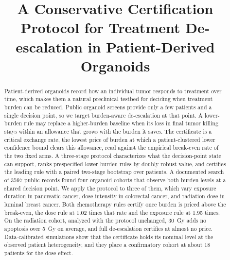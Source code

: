\documentclass[conference]{IEEEtran}
\begin{document}
\title{A Conservative Certification Protocol for Treatment De-escalation in Patient-Derived Organoids}

\author{
\and
{}
\and
{}
}

\maketitle

\begin{abstract}
Patient-derived organoids record how an individual tumor responds to treatment over time, which makes them a natural preclinical testbed for deciding when treatment burden can be reduced. Public organoid screens provide only a few patients and a single decision point, so we target burden-aware de-escalation at that point. A lower-burden rule may replace a higher-burden baseline when its loss in final tumor killing stays within an allowance that grows with the burden it saves. The certificate is a critical exchange rate, the lowest price of burden at which a patient-clustered lower confidence bound clears this allowance, read against the empirical break-even rate of the two fixed arms. A three-stage protocol characterizes what the decision-point state can support, ranks prespecified lower-burden rules by doubly robust value, and certifies the leading rule with a paired two-stage bootstrap over patients. A documented search of 3597 public records found four organoid cohorts that observe both burden levels at a shared decision point. We apply the protocol to three of them, which vary exposure duration in pancreatic cancer, dose intensity in colorectal cancer, and radiation dose in luminal breast cancer. Both chemotherapy rules certify once burden is priced above the break-even, the dose rule at 1.02 times that rate and the exposure rule at 1.95 times. On the radiation cohort, analyzed with the protocol unchanged, 30~Gy adds no apoptosis over 5~Gy on average, and full de-escalation certifies at almost no price. Data-calibrated simulations show that the certificate holds its nominal level at the observed patient heterogeneity, and they place a confirmatory cohort at about 18 patients for the dose effect.
\end{abstract}
\end{document}
